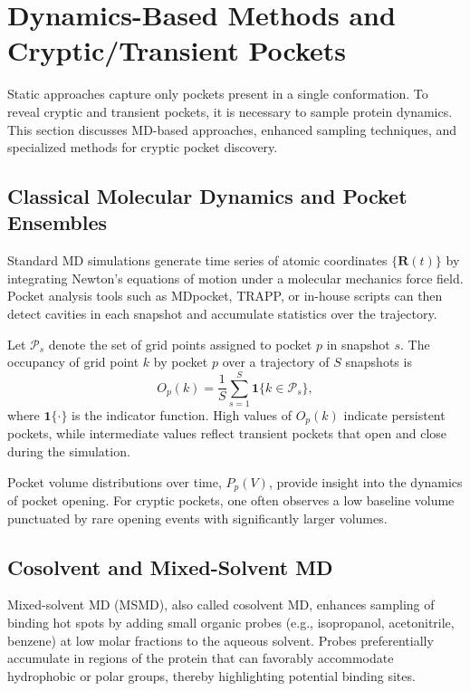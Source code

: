 \documentclass[12pt,a4paper]{article}
\begin{document}
\section{Dynamics-Based Methods and Cryptic/Transient Pockets}

Static approaches capture only pockets present in a single conformation. To reveal cryptic and transient pockets, it is necessary to sample protein dynamics. This section discusses MD-based approaches, enhanced sampling techniques, and specialized methods for cryptic pocket discovery.

\subsection{Classical Molecular Dynamics and Pocket Ensembles}

Standard MD simulations generate time series of atomic coordinates \(\{\mathbf{R}(t)\}\) by integrating Newton’s equations of motion under a molecular mechanics force field. Pocket analysis tools such as MDpocket, TRAPP, or in-house scripts can then detect cavities in each snapshot and accumulate statistics over the trajectory.\cite{CH5_Kuzmanic2020,CH5_Gasparikova2025}

Let \(\mathcal{P}_s\) denote the set of grid points assigned to pocket \(p\) in snapshot \(s\). The occupancy of grid point \(k\) by pocket \(p\) over a trajectory of \(S\) snapshots is
\begin{equation}
O_{p}(k) = \frac{1}{S} \sum_{s=1}^{S} \mathbf{1}\{k \in \mathcal{P}_s\},
\label{eq:occupancy}
\end{equation}
where \(\mathbf{1}\{\cdot\}\) is the indicator function. High values of \(O_p(k)\) indicate persistent pockets, while intermediate values reflect transient pockets that open and close during the simulation.

Pocket volume distributions over time, \(P_p(V)\), provide insight into the dynamics of pocket opening. For cryptic pockets, one often observes a low baseline volume punctuated by rare opening events with significantly larger volumes.\cite{CH5_Kuzmanic2020}

\subsection{Cosolvent and Mixed-Solvent MD}

Mixed-solvent MD (MSMD), also called cosolvent MD, enhances sampling of binding hot spots by adding small organic probes (e.g., isopropanol, acetonitrile, benzene) at low molar fractions to the aqueous solvent.\cite{CH5_Kuzmanic2020,CH5_Gasparikova2025} Probes preferentially accumulate in regions of the protein that can favorably accommodate hydrophobic or polar groups, thereby highlighting potential binding sites.
\end{document}
